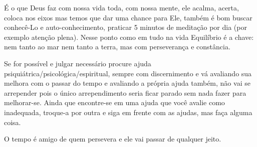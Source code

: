 \emdash{}É o que Deus faz com nossa vida toda, com nossa mente, ele acalma, acerta, coloca nos eixos mas temos que dar uma chance para Ele, também é bom buscar conhecê-Lo e auto-conhecimento, praticar 5 minutos de meditação por dia (por exemplo atenção plena). Nesse ponto como em tudo na vida Equilíbrio é a chave: nem tanto ao mar nem tanto a terra, mas com perseverança e constância. 

\emdash{}Se for possível e julgar necessário procure ajuda psiquiátrica/psicológica/espiritual, sempre com discernimento e vá avaliando sua melhora com o passar do tempo e avaliando a própria ajuda também, não vai se arrepender pois o único arrependimento seria ficar parado sem nada fazer para melhorar-se. Ainda que encontre-se em uma ajuda que você avalie como inadequada, troque-a por outra e siga em frente com as ajudas, mas faça alguma coisa.

\emdash{}O tempo é amigo de quem persevera e ele vai passar de qualquer jeito.